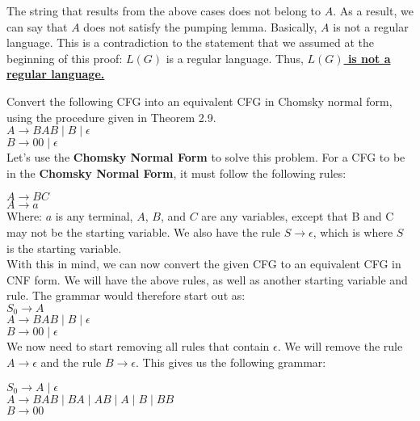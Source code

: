 \documentclass[12pt]{article}
\begin{document}
The string that results from the above cases does not belong to $A$. As a result, we can say that
$A$ does not satisfy the pumping lemma. Basically, $A$ is not a regular language. This is a
contradiction to the statement that we assumed at the beginning of this proof: 
$L(G)$ is a regular language. Thus, \underline{\textbf{$L(G)$ is not a regular language.}}

 Convert the following CFG into an equivalent CFG in Chomsky normal form,
using the procedure given in Theorem 2.9. \\

$A \rightarrow BAB \; | \; B \; | \; \epsilon $ \\
$B \rightarrow 00 \; | \; \epsilon $ \\

Let's use the \textbf{Chomsky Normal Form} to solve this problem. For a CFG to be in
the \textbf{Chomsky Normal Form}, it must follow the following rules:

$A \rightarrow BC$ \\
$A \rightarrow a$  \\

Where: $a$ is any terminal, $A$, $B$, and $C$ are any variables, except that B and C may not be the starting variable.
We also have the rule $S \rightarrow \epsilon$, which is where $S$ is the starting variable. \\

With this in mind, we can now convert the given CFG to an equivalent CFG in CNF form.
We will have the above rules, as well as another starting variable and rule. The grammar
would therefore start out as: \\
$S_0 \rightarrow A$ \\
$A \rightarrow BAB \; | \; B \; | \; \epsilon $ \\
$B \rightarrow 00 \; | \; \epsilon $ \\

We now need to start removing all rules that contain $\epsilon$. We will remove the rule
$A \rightarrow \epsilon$ and the rule $B \rightarrow \epsilon$. This gives us the following
grammar:

$S_0 \rightarrow A \; | \; \epsilon$ \\
$A \rightarrow BAB \; | \; BA \; | \; AB \; | \; A \; | \; B \; | \; BB $ \\
$B \rightarrow 00 $ \\
\end{document}
